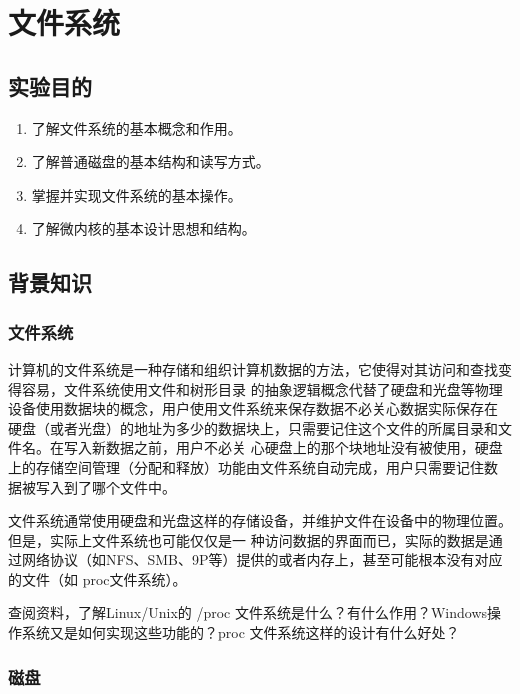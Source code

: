 \chapter{文件系统}

\section{实验目的}
  \begin{enumerate}
    \item 了解文件系统的基本概念和作用。
    \item 了解普通磁盘的基本结构和读写方式。
    \item 掌握并实现文件系统的基本操作。
    \item 了解微内核的基本设计思想和结构。
  \end{enumerate}

\section{背景知识}

\subsection{文件系统}

计算机的文件系统是一种存储和组织计算机数据的方法，它使得对其访问和查找变得容易，文件系统使用文件和树形目录
的抽象逻辑概念代替了硬盘和光盘等物理设备使用数据块的概念，用户使用文件系统来保存数据不必关心数据实际保存在
硬盘（或者光盘）的地址为多少的数据块上，只需要记住这个文件的所属目录和文件名。在写入新数据之前，用户不必关
心硬盘上的那个块地址没有被使用，硬盘上的存储空间管理（分配和释放）功能由文件系统自动完成，用户只需要记住数
据被写入到了哪个文件中。

文件系统通常使用硬盘和光盘这样的存储设备，并维护文件在设备中的物理位置。但是，实际上文件系统也可能仅仅是一
种访问数据的界面而已，实际的数据是通过网络协议（如NFS、SMB、9P等）提供的或者内存上，甚至可能根本没有对应
的文件（如 proc文件系统）。

\begin{thinking}\label{think-proc}
查阅资料，了解Linux/Unix的 /proc 文件系统是什么？有什么作用？Windows操作系统又是如何实现这些功能的？proc
文件系统这样的设计有什么好处？
\end{thinking}

\subsection{磁盘}

